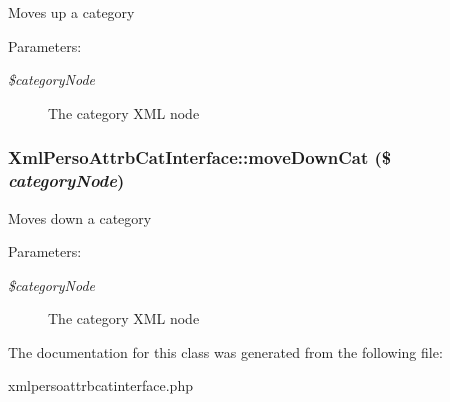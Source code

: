Moves up a category

\begin{Desc}
\item[Parameters:]
\begin{description}
\item[{\em \$category\-Node}]The category XML node \end{description}
\end{Desc}
\subsubsection{\setlength{\rightskip}{0pt plus 5cm}Xml\-Perso\-Attrb\-Cat\-Interface::move\-Down\-Cat (\$ {\em category\-Node})}\label{classXmlPersoAttrbCatInterface_d460ea461bce0c848e97a6e0d3b6c897}


Moves down a category

\begin{Desc}
\item[Parameters:]
\begin{description}
\item[{\em \$category\-Node}]The category XML node \end{description}
\end{Desc}


The documentation for this class was generated from the following file:\begin{CompactItemize}
\item 
xmlpersoattrbcatinterface.php\end{CompactItemize}
